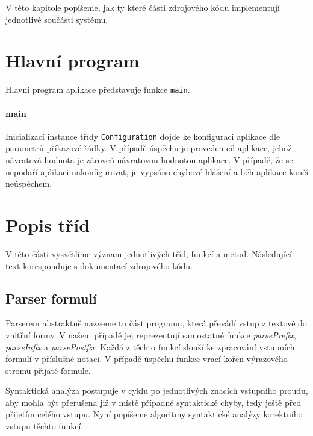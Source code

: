 \documentclass[thesis=B,czech,hidelinks]{thesis}[2012/06/26]
\begin{document}
V této kapitole popíšeme, jak ty které části zdrojového kódu implementují jednotlivé součásti systému.

\section{Hlavní program}

Hlavní program aplikace představuje funkce \texttt{main}.

\paragraph{main}

Inicializací instance třídy \texttt{Configuration} dojde ke konfiguraci aplikace dle parametrů příkazové řádky. V případě úspěchu je proveden cíl aplikace, jehož návratová hodnota je zároveň návratovou hodnotou aplikace. V případě, že se nepodaří aplikaci nakonfigurovat, je vypsáno chybové hlášení a běh aplikace končí neúspěchem.

\section{Popis tříd}

V této části vysvětlíme význam jednotlivých tříd, funkcí a metod. Následující text koresponduje s dokumentací zdrojového kódu.

























\subsection{Parser formulí}

Parserem abstraktně nazveme tu část programu, která převádí vstup z textové do vnitřní formy. V našem případě jej reprezentují samostatné funkce \emph{parsePrefix}, \emph{parseInfix} a \emph{parsePostfix}. Každá z těchto funkcí slouží ke zpracování vstupních formulí v příslušné notaci. V případě úspěchu funkce vrací kořen výrazového stromu přijaté formule.

Syntaktická analýza postupuje v cyklu po jednotlivých znacích vstupního proudu, aby mohla být přerušena již v místě případné syntaktické chyby, tedy ještě před přijetím celého vstupu. Nyní popíšeme algoritmy syntaktické analýzy korektního vstupu těchto funkcí.
\end{document}
